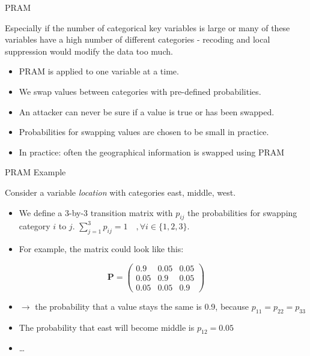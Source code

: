 \documentclass[ignorenonframetext,]{beamer}
\providecommand{\tightlist}{%
  \setlength{\itemsep}{0pt}\setlength{\parskip}{0pt}}
\begin{document}
\begin{frame}{PRAM}
\protect\hypertarget{pram}{}

Especially if the number of categorical key variables is large or many
of these variables have a high number of different categories - recoding
and local suppression would modify the data too much.

\begin{itemize}
\tightlist
\item
  PRAM is applied to one variable at a time.
\item
  We swap values between categories with pre-defined probabilities.
\item
  An attacker can never be sure if a value is true or has been swapped.
\item
  Probabilities for swapping values are chosen to be small in practice.
\item
  In practice: often the geographical information is swapped using PRAM
\end{itemize}

\end{frame}

\begin{frame}{PRAM Example}
\protect\hypertarget{pram-example}{}

Consider a variable \textit{location} with categories east, middle,
west.

\begin{itemize}
\tightlist
\item
  We define a 3-by-3 transition matrix with \(p_{ij}\) the probabilities
  for swapping category \(i\) to \(j\).
  \(\sum_{j=1}^3 p_{ij} = 1 \quad , \forall i \in \{1,2,3\}\).
\item
  For example, the matrix could look like this:
\end{itemize}

\[ \mathbf{P} = \left( \begin{array}{ccc}
0.9 & 0.05 & 0.05 \\
0.05 & 0.9 & 0.05 \\
0.05 & 0.05 & 0.9 \end{array} \right)\]

\begin{itemize}
\tightlist
\item
  \(\rightarrow\) the probability that a value stays the same is 0.9,
  because \(p_{11}=p_{22}=p_{33}\)
\item
  The probability that east will become middle is \(p_{12} = 0.05\)
\item
  \ldots{}
\end{itemize}

\end{frame}
\end{document}
